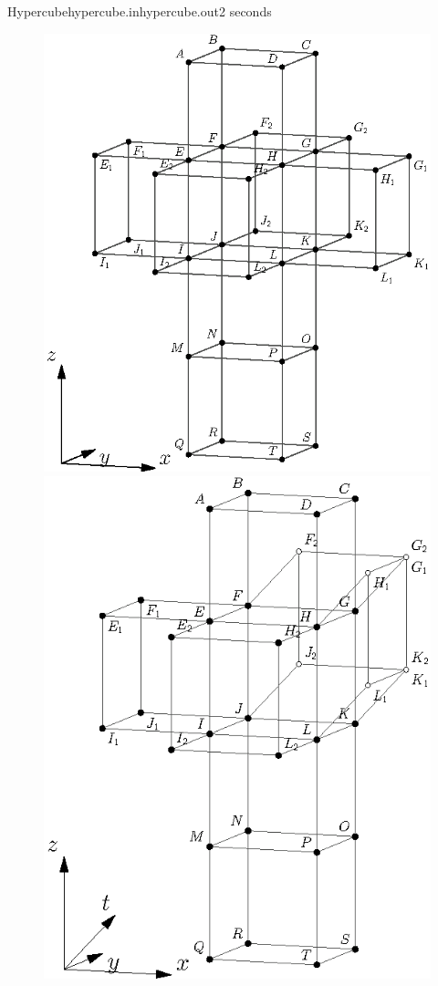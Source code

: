 \begin{problem}{Hypercube}{hypercube.in}{hypercube.out}{2 seconds}
\begin{figure}[h!]
\begin{minipage}[b]{0.5\textwidth}
\centering\includegraphics{pics/hypercube1.eps}
\end{minipage}%
\begin{minipage}[b]{0.5\textwidth}
\centering\includegraphics{pics/hypercube2.eps}

\end{minipage}
\end{figure}
\end{problem}

